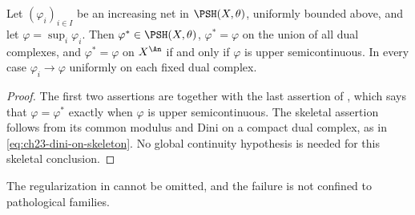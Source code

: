 \begin{corollary}
\label{cor:ch23-increasing-net}
Let $(\varphi_i)_{i\in I}$ be an increasing net in $\PSH(X,\theta)$,
uniformly bounded above, and let $\varphi=\sup_i\varphi_i$.  Then
$\varphi^*\in\PSH(X,\theta)$, $\varphi^*=\varphi$ on the union of all
dual complexes, and
$\varphi^*=\varphi$ on $X^{\An}$ if and only if $\varphi$ is upper
semicontinuous.  In every case
$\varphi_i\to\varphi$ uniformly on each fixed dual complex.
\end{corollary}

\begin{proof}
The first two assertions are  together with
the last assertion of , which says that
$\varphi=\varphi^*$ exactly when $\varphi$ is upper semicontinuous.  The
skeletal assertion follows from its common modulus and Dini on a compact
dual complex, as in \eqref{eq:ch23-dini-on-skeleton}.  No global continuity hypothesis is needed for this skeletal conclusion.
\end{proof}

The regularization in  cannot be omitted, and
the failure is not confined to pathological families.

